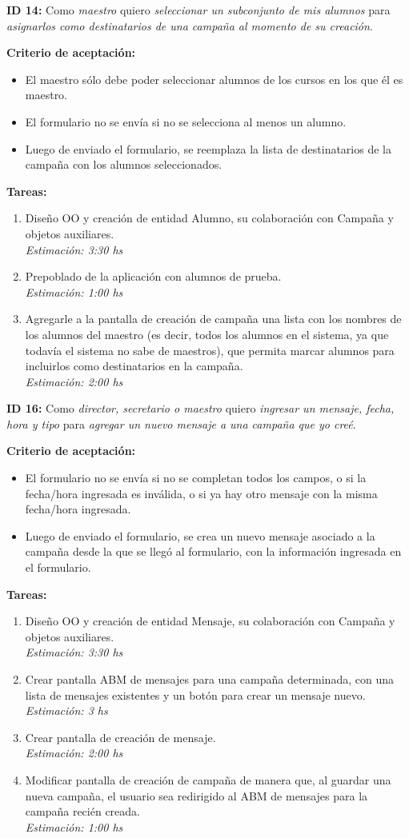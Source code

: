 \documentclass[a4paper, 10pt, twoside]{article}
\newcommand{\sprintstory}[4]{
  \noindent
  \textbf{ID #1:} Como \emph{#2} quiero \emph{#3} para \emph{#4}.
}
\newenvironment{criterios}{
  \textbf{Criterio de aceptación:}
  \begin{itemize}
}{
  \end{itemize}
}
\newcommand{\criterio}[1] {
  \item #1
}
\newenvironment{tasks}{
  \textbf{Tareas:}
  \begin{enumerate}
}{
  \end{enumerate}
}
\newcommand{\task}[2] {
  \item #1.\\
  \emph{Estimación: #2 hs}
}
\begin{document}
\sprintstory{14}
            {maestro}
            {seleccionar un subconjunto de mis alumnos}
            {asignarlos como destinatarios de una campaña al momento de su creación}

\begin{criterios}
  \criterio{El maestro sólo debe poder seleccionar alumnos de los cursos en los que él es maestro.}
  \criterio{El formulario no se envía si no se selecciona al menos un alumno.}
  \criterio{Luego de enviado el formulario, se reemplaza la lista de destinatarios de la campaña con los alumnos seleccionados.}
\end{criterios}

\begin{tasks}
  \task{Diseño OO y creación de entidad Alumno, su colaboración con Campaña y objetos auxiliares}{3:30}
  \task{Prepoblado de la aplicación con alumnos de prueba}{1:00}
  \task{Agregarle a la pantalla de creación de campaña una lista con los nombres de los alumnos del maestro (es decir, todos los alumnos en el sistema, ya que todavía el sistema no sabe de maestros), que permita marcar alumnos para incluirlos como destinatarios en la campaña}{2:00}
\end{tasks}


\sprintstory{16}
            {director, secretario o maestro}
            {ingresar un mensaje, fecha, hora y tipo}
            {agregar un nuevo mensaje a una campaña que yo creé}

\begin{criterios}
  \criterio{El formulario no se envía si no se completan todos los campos, o si la fecha/hora ingresada es inválida, o si ya hay otro mensaje con la misma fecha/hora ingresada.}
  \criterio{Luego de enviado el formulario, se crea un nuevo mensaje asociado a la campaña desde la que se llegó al formulario, con la información ingresada en el formulario.}
\end{criterios}

\begin{tasks}
  \task{Diseño OO y creación de entidad Mensaje, su colaboración con Campaña y objetos auxiliares}{3:30}
  \task{Crear pantalla ABM de mensajes para una campaña determinada, con una lista de mensajes existentes y un botón para crear un mensaje nuevo}{3}
  \task{Crear pantalla de creación de mensaje}{2:00}
  \task{Modificar pantalla de creación de campaña de manera que, al guardar una nueva campaña, el usuario sea redirigido al ABM de mensajes para la campaña recién creada}{1:00}
\end{tasks}
\end{document}
